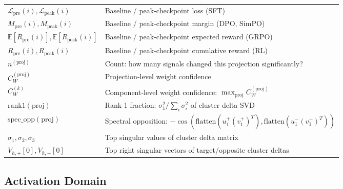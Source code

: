 \documentclass[11pt]{article}
\begin{document}
\begin{center}
\begin{tabular}{lp{}}
$\mathcal{L}_{\text{pre}}(i), \mathcal{L}_{\text{peak}}(i)$ & Baseline / peak-checkpoint loss (SFT) \\
$M_{\text{pre}}(i), M_{\text{peak}}(i)$ & Baseline / peak-checkpoint margin (DPO, SimPO) \\
$\mathbb{E}[R_{\text{pre}}(i)], \mathbb{E}[R_{\text{peak}}(i)]$ & Baseline / peak-checkpoint expected reward (GRPO) \\
$R_{\text{pre}}(i), R_{\text{peak}}(i)$ & Baseline / peak-checkpoint cumulative reward (RL) \\
$n^{(\text{proj})}$ & Count: how many signals changed this projection significantly? \\
$C^{(\text{proj})}_W$ & Projection-level weight confidence \\
$C^{(k)}_W$ & Component-level weight confidence: $\max_{\text{proj}} C^{(\text{proj})}_W$ \\
$\text{rank1}(\text{proj})$ & Rank-1 fraction: $\sigma_1^2 / \sum_i \sigma_i^2$ of cluster delta SVD \\
$\text{spec\_opp}(\text{proj})$ & Spectral opposition: $-\cos(\text{flatten}(u^+_1 (v^+_1)^T), \text{flatten}(u^-_1 (v^-_1)^T))$ \\
$\sigma_1, \sigma_2, \sigma_3$ & Top singular values of cluster delta matrix \\
$V_{h,+}[0], V_{h,-}[0]$ & Top right singular vectors of target/opposite cluster deltas \\
\bottomrule
\end{tabular}
\end{center}

\subsection{Activation Domain}
\label{app:notation-activation-domain}
\end{document}
